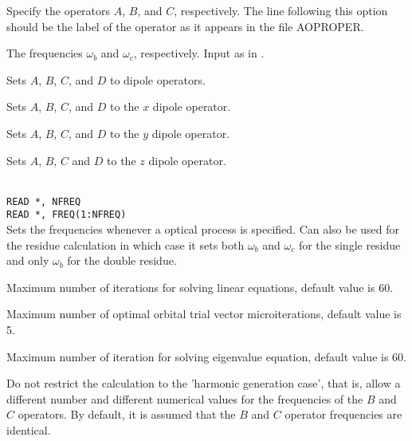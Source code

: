 \begin{description}

\item[, , ]
Specify the operators $A$, $B$, and $C$, respectively.
The line following this
option should be the label of the operator as it appears in the file
AOPROPER.

\item[, ]
The frequencies
$\omega_b$ and $\omega_c$, respectively. Input as in
.

\item{}
Sets $A$, $B$, $C$, and $D$ to dipole operators.

\item{}
Sets $A$, $B$, $C$, and $D$ to the $x$ dipole operator.

\item{}
Sets $A$, $B$, $C$, and $D$ to the $y$ dipole operator.

\item{}
Sets $A$, $B$, $C$ and $D$ to the $z$ dipole operator.

\item{}\\
\verb|READ *, NFREQ|\\
\verb|READ *, FREQ(1:NFREQ)|\\
Sets the frequencies whenever a optical process is specified.
Can also be used for the residue calculation in which case it sets
both $\omega_b$ and $\omega_c$ for the single residue and only
$\omega_b$ for the double residue.

\item{}
Maximum number of iterations for solving linear equations, default value is 60.

\item{}
Maximum number of optimal orbital trial vector microiterations,
default value is 5.

\item{}
Maximum number of iteration for solving eigenvalue equation, default
value is 60.

\item{} Do not restrict the calculation to the 'harmonic
  generation case', that is, allow a different number and different
  numerical values for the frequencies of the $B$ and $C$
  operators. By default, it is assumed that the $B$ and $C$ operator
  frequencies are identical.


\end{description}
